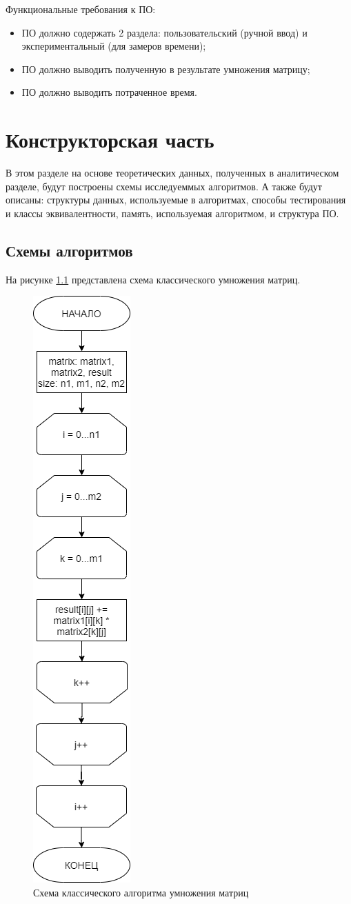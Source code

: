 \documentclass[12pt]{report}
\begin{document}
	Функциональные требования к ПО:
	
	\begin{itemize}
		\item ПО должно содержать 2 раздела: пользовательский (ручной ввод) и экспериментальный (для замеров времени);
		\item ПО должно выводить полученную в результате умножения матрицу;
		\item ПО должно выводить потраченное время.
	\end{itemize}
	
	\clearpage
	
	\chapter{Конструкторская часть}
	
	В этом разделе на основе теоретических данных, полученных в аналитическом разделе, будут построены схемы исследуеммых алгоритмов. А также будут описаны: структуры данных, используемые в алгоритмах, способы тестирования и классы эквивалентности, память, используемая алгоритмом, и структура ПО.
	
	\section{Схемы алгоритмов}
	На рисунке \ref{fig:base} представлена схема классического умножения матриц.
	
	
	\begin{figure}[h]
		\centering
		\includegraphics[width=0.12\linewidth]{base.jpg}
		\caption{Схема классического алгоритма умножения матриц}
		\label{fig:base}
	\end{figure}
\end{document}
